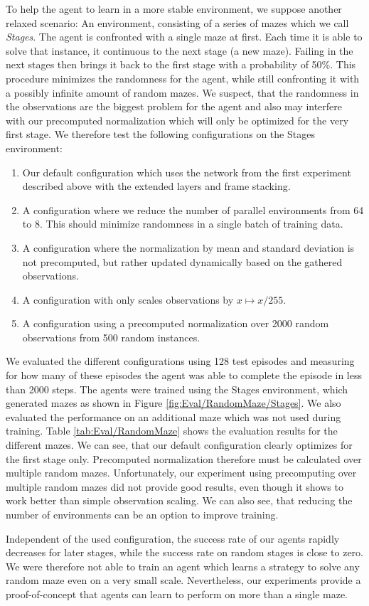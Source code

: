 To help the agent to learn in a more stable environment, we suppose another relaxed scenario: An environment, consisting of a series of mazes which we call \textit{Stages}. The agent is confronted with a single maze at first. Each time it is able to solve that instance, it continuous to the next stage (a new maze). Failing in the next stages then brings it back to the first stage with a probability of 50\%. This procedure minimizes the randomness for the agent, while still confronting it with a possibly infinite amount of random mazes. We suspect, that the randomness in the observations are the biggest problem for the agent and also may interfere with our precomputed normalization which will only be optimized for the very first stage. We therefore test the following configurations on the Stages environment:

\begin{enumerate}
    \item Our default configuration which uses the network from the first experiment described above with the extended layers and frame stacking. 
    \item A configuration where we reduce the number of parallel environments from 64 to 8. This should minimize randomness in a single batch of training data.
    \item A configuration where the normalization by mean and standard deviation is not precomputed, but rather updated dynamically based on the gathered observations.
    \item A configuration with only scales observations by $x \mapsto x / 255$.
    \item A configuration using a precomputed normalization over 2000 random observations from 500 random instances.
\end{enumerate}

We evaluated the different configurations using 128 test episodes and measuring for how many of these episodes the agent was able to complete the episode in less than 2000 steps. The agents were trained using the Stages environment, which generated mazes as shown in Figure \ref{fig:Eval/RandomMaze/Stages}. We also evaluated the performance on an additional maze which was not used during training. Table \ref{tab:Eval/RandomMaze} shows the evaluation results for the different mazes. We can see, that our default configuration clearly optimizes for the first stage only. Precomputed normalization therefore must be calculated over multiple random mazes. Unfortunately, our experiment using precomputing over multiple random mazes did not provide good results, even though it shows to work better than simple observation scaling. We can also see, that reducing the number of environments can be an option to improve training. 

Independent of the used configuration, the success rate of our agents rapidly decreases for later stages, while the success rate on random stages is close to zero. We were therefore not able to train an agent which learns a strategy to solve any random maze even on a very small scale. Nevertheless, our experiments provide a proof-of-concept that agents can learn to perform on more than a single maze.